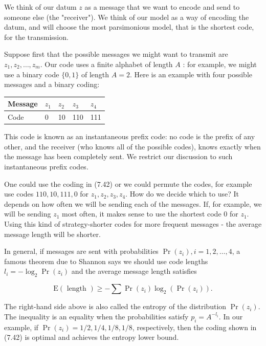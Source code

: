 \documentclass[10pt]{article}
\begin{document}
We think of our datum $z$ as a message that we want to encode and send to someone else (the "receiver"). We think of our model as a way of encoding the datum, and will choose the most parsimonious model, that is the shortest code, for the transmission.

Suppose first that the possible messages we might want to transmit are $z_{1}, z_{2}, \ldots, z_{m}$. Our code uses a finite alphabet of length $A$ : for example, we might use a binary code $\{0,1\}$ of length $A=2$. Here is an example with four possible messages and a binary coding:

\begin{center}
\begin{tabular}{l||l|l|l|l}
Message & $z_{1}$ & $z_{2}$ & $z_{3}$ & $z_{4}$ \\
\hline
Code & 0 & 10 & 110 & 111 \\
\hline
\end{tabular}
\end{center}

This code is known as an instantaneous prefix code: no code is the prefix of any other, and the receiver (who knows all of the possible codes), knows exactly when the message has been completely sent. We restrict our discussion to such instantaneous prefix codes.

One could use the coding in (7.42) or we could permute the codes, for example use codes $110,10,111,0$ for $z_{1}, z_{2}, z_{3}, z_{4}$. How do we decide which to use? It depends on how often we will be sending each of the messages. If, for example, we will be sending $z_{1}$ most often, it makes sense to use the shortest code 0 for $z_{1}$. Using this kind of strategy-shorter codes for more frequent messages - the average message length will be shorter.

In general, if messages are sent with probabilities $\operatorname{Pr}\left(z_{i}\right), i=1,2, \ldots, 4$, a famous theorem due to Shannon says we should use code lengths $l_{i}= -\log _{2} \operatorname{Pr}\left(z_{i}\right)$ and the average message length satisfies


\begin{equation*}
\mathrm{E}(\text { length }) \geq-\sum \operatorname{Pr}\left(z_{i}\right) \log _{2}\left(\operatorname{Pr}\left(z_{i}\right)\right) . \tag{7.43}
\end{equation*}


The right-hand side above is also called the entropy of the distribution $\operatorname{Pr}\left(z_{i}\right)$. The inequality is an equality when the probabilities satisfy $p_{i}= A^{-l_{i}}$. In our example, if $\operatorname{Pr}\left(z_{i}\right)=1 / 2,1 / 4,1 / 8,1 / 8$, respectively, then the coding shown in (7.42) is optimal and achieves the entropy lower bound.
\end{document}
